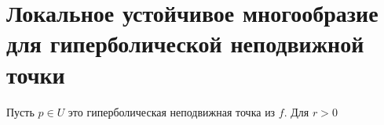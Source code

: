 \section{Локальное устойчивое многообразие для гиперболической неподвижной точки}

Пусть $p \in U$ это гиперболическая неподвижная точка из $f$. Для $r > 0$
